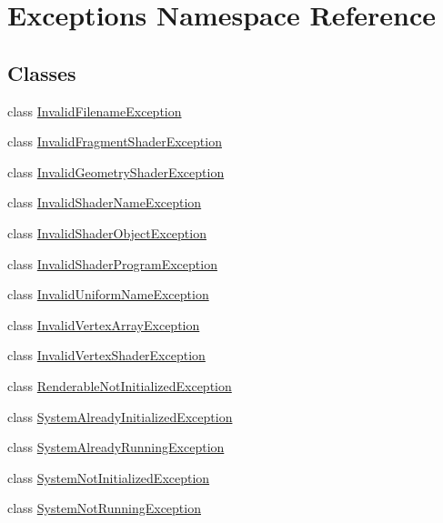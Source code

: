\hypertarget{namespace_exceptions}{}\section{Exceptions Namespace Reference}
\label{namespace_exceptions}
\subsection*{Classes}
\begin{DoxyCompactItemize}
\item 
class \hyperlink{class_exceptions_1_1_invalid_filename_exception}{Invalid\+Filename\+Exception}
\item 
class \hyperlink{class_exceptions_1_1_invalid_fragment_shader_exception}{Invalid\+Fragment\+Shader\+Exception}
\item 
class \hyperlink{class_exceptions_1_1_invalid_geometry_shader_exception}{Invalid\+Geometry\+Shader\+Exception}
\item 
class \hyperlink{class_exceptions_1_1_invalid_shader_name_exception}{Invalid\+Shader\+Name\+Exception}
\item 
class \hyperlink{class_exceptions_1_1_invalid_shader_object_exception}{Invalid\+Shader\+Object\+Exception}
\item 
class \hyperlink{class_exceptions_1_1_invalid_shader_program_exception}{Invalid\+Shader\+Program\+Exception}
\item 
class \hyperlink{class_exceptions_1_1_invalid_uniform_name_exception}{Invalid\+Uniform\+Name\+Exception}
\item 
class \hyperlink{class_exceptions_1_1_invalid_vertex_array_exception}{Invalid\+Vertex\+Array\+Exception}
\item 
class \hyperlink{class_exceptions_1_1_invalid_vertex_shader_exception}{Invalid\+Vertex\+Shader\+Exception}
\item 
class \hyperlink{class_exceptions_1_1_renderable_not_initialized_exception}{Renderable\+Not\+Initialized\+Exception}
\item 
class \hyperlink{class_exceptions_1_1_system_already_initialized_exception}{System\+Already\+Initialized\+Exception}
\item 
class \hyperlink{class_exceptions_1_1_system_already_running_exception}{System\+Already\+Running\+Exception}
\item 
class \hyperlink{class_exceptions_1_1_system_not_initialized_exception}{System\+Not\+Initialized\+Exception}
\item 
class \hyperlink{class_exceptions_1_1_system_not_running_exception}{System\+Not\+Running\+Exception}
\end{DoxyCompactItemize}
